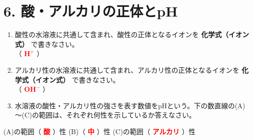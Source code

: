 \section*{6. 酸・アルカリの正体とpH}
\begin{enumerate}
    \item 酸性の水溶液に共通して含まれ、酸性の正体となるイオンを \textbf{化学式（イオン式）} で書きなさい。\\[0.2cm]
    （ \textcolor{red}{$\mathbf{H^+}$} ）
    \item アルカリ性の水溶液に共通して含まれ、アルカリ性の正体となるイオンを \textbf{化学式（イオン式）} で書きなさい。\\[0.2cm]
    （ \textcolor{red}{$\mathbf{OH^-}$} ）
    \item 水溶液の酸性・アルカリ性の強さを表す数値をpHという。下の数直線の(A)～(C)の範囲は、それぞれ何性を示しているか答えなさい。
\end{enumerate}

\begin{center}
\end{center}
\vspace{0.3cm}
\begin{flushright}
(A)の範囲（ \textcolor{red}{\textbf{酸}} ）性 \hspace{0.5cm} (B)（ \textcolor{red}{\textbf{中}} ）性 \hspace{0.5cm} (C)の範囲（ \textcolor{red}{\textbf{アルカリ}} ）性
\end{flushright}
